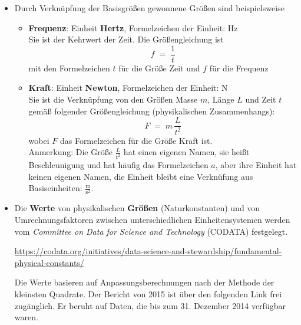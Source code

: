 \begin{raggedright}
\begin{enumerate}
\begin{itemize}
\begin{verbatim}
https://en.wikipedia.org/wiki/2019_redefinition_of_the_SI_base_units

https://www.ptb.de/cms/fileadmin/internet/presse_aktuelles/broschueren/
  intern_einheitensystem/Die_gesetzlichen_Einheiten.pdf

https://eur-lex.europa.eu/legal-content/DE/TXT/PDF/?uri=CELEX:32019L1258&from=EN
	\end{verbatim}
	\item Durch Verknüpfung der Basisgrößen gewonnene Größen sind beispielsweise
		\begin{itemize}
		\item \textbf{Frequenz}: Einheit \textbf{Hertz}, Formelzeichen der Einheit: Hz\\
			Sie ist der Kehrwert der Zeit. Die Größengleichung ist
\begin{equation}
			f \; = \; \frac{1}{t}
\end{equation}
			mit den Formelzeichen $t$ für die Größe Zeit und $f$ für die Frequenz
		\item \textbf{Kraft}: Einheit \textbf{Newton}, Formelzeichen der Einheit: N\\
			Sie ist die Verknüpfung von den Größen Masse $m$, Länge $L$ und Zeit $t$
			gemäß folgender Größengleichung (physikalischen Zusammenhangs):
\begin{equation}
			F \; = \; m \, \frac{L}{t^2}
\end{equation}
			wobei $F$ das Formelzeichen für die Größe Kraft ist.\\
			Anmerkung: Die Größe $\frac{L}{t^2}$ hat einen eigenen Namen, sie heißt
			Beschleunigung und hat häufig das Formelzeichen $a$, aber ihre Einheit hat keinen
			eigenen Namen, die Einheit bleibt eine Verknüfung aus Basiseinheiten:
			$\frac{\mathrm{m}}{\mathrm{s}^2}$.
		\end{itemize}
		\item Die \textbf{Werte} von physikalischen \textbf{Größen} (Naturkonstanten)
			und von Umrechnungsfaktoren zwischen unterschiedlichen
			Einheitensystemen werden vom \textsl{Committee on Data for Science and Technology} (CODATA)
			festgelegt. 
			
			\url{https://codata.org/initiatives/data-science-and-stewardship/fundamental-physical-constants/}

			Die Werte basieren auf Anpassungsberechnungen nach der Methode der kleinsten Quadrate. Der Bericht von 2015 ist über den folgenden Link frei zugänglich. Er beruht auf Daten, die bis zum 31. Dezember 2014 verfügbar waren.


\end{itemize}
\end{enumerate}
\end{raggedright}
